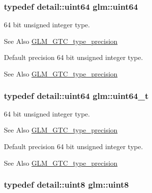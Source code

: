 \hypertarget{group__gtc__type__precision_gae3632bf9b37da66233d78930dd06378a}{
\subsubsection[{uint64}]{\setlength{\rightskip}{0pt plus 5cm}typedef detail\-::uint64 {\bf glm\-::uint64}}}\label{group__gtc__type__precision_gae3632bf9b37da66233d78930dd06378a}
64 bit unsigned integer type. \begin{DoxySeeAlso}{See Also}
\hyperlink{group__gtc__type__precision}{G\-L\-M\-\_\-\-G\-T\-C\-\_\-type\-\_\-precision}
\end{DoxySeeAlso}
Default precision 64 bit unsigned integer type. \begin{DoxySeeAlso}{See Also}
\hyperlink{group__gtc__type__precision}{G\-L\-M\-\_\-\-G\-T\-C\-\_\-type\-\_\-precision} 
\end{DoxySeeAlso}
\hypertarget{group__gtc__type__precision_ga058f57c19e1befdcf12498944bd73e69}{
\subsubsection[{uint64\-\_\-t}]{\setlength{\rightskip}{0pt plus 5cm}typedef detail\-::uint64 {\bf glm\-::uint64\-\_\-t}}}\label{group__gtc__type__precision_ga058f57c19e1befdcf12498944bd73e69}
64 bit unsigned integer type. \begin{DoxySeeAlso}{See Also}
\hyperlink{group__gtc__type__precision}{G\-L\-M\-\_\-\-G\-T\-C\-\_\-type\-\_\-precision}
\end{DoxySeeAlso}
Default precision 64 bit unsigned integer type. \begin{DoxySeeAlso}{See Also}
\hyperlink{group__gtc__type__precision}{G\-L\-M\-\_\-\-G\-T\-C\-\_\-type\-\_\-precision} 
\end{DoxySeeAlso}
\hypertarget{group__gtc__type__precision_ga1a7dcd8aac97cc8020817c94049deff2}{
\subsubsection[{uint8}]{\setlength{\rightskip}{0pt plus 5cm}typedef detail\-::uint8 {\bf glm\-::uint8}}}\label{group__gtc__type__precision_ga1a7dcd8aac97cc8020817c94049deff2}
